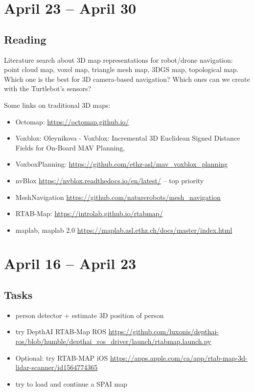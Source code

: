 \documentclass{article}
\begin{document}
\section{April 23 -- April 30}

\subsection{Reading}
Literature search about 3D map representations for robot/drone navigation: point cloud map, voxel map, triangle mesh map, 3DGS map, topological map. Which one is the best for 3D camera-based navigation? Which ones can we create with the Turtlebot's sensors?

Some links on traditional 3D maps:
\begin{itemize}
\item Octomap: \url{https://octomap.github.io/}
\item Voxblox: Oleynikova - Voxblox: Incremental 3D Euclidean Signed Distance Fields for On-Board MAV Planning, 
\item VoxboxPlanning: \url{https://github.com/ethz-asl/mav_voxblox_planning}
\item nvBlox \url{https://nvblox.readthedocs.io/en/latest/} -- top priority
\item MeshNavigation \url{https://github.com/naturerobots/mesh_navigation}
\item RTAB-Map: \url{https://introlab.github.io/rtabmap/}
\item maplab, maplab 2.0 \url{https://maplab.asl.ethz.ch/docs/master/index.html}
\end{itemize}
\newpage

\section{April 16 -- April 23}

\subsection{Tasks}
\begin{itemize}
\item person detector + estimate 3D position of person 
\item try DepthAI RTAB-Map ROS \url{https://github.com/luxonis/depthai-ros/blob/humble/depthai_ros_driver/launch/rtabmap.launch.py} 
\item Optional: try RTAB-MAP iOS \url{https://apps.apple.com/ca/app/rtab-map-3d-lidar-scanner/id1564774365}
\item try to load and continue a SPAI map
\end{itemize}
\end{document}
